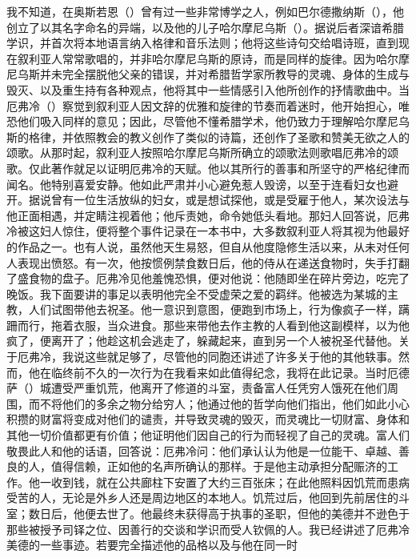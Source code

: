 我不知道，在奥斯若恩（）曾有过一些非常博学之人，例如巴尔德撒纳斯（），他创立了以其名字命名的异端，以及他的儿子哈尔摩尼乌斯（）。据说后者深谙希腊学识，并首次将本地语言纳入格律和音乐法则；他将这些诗句交给唱诗班，直到现在叙利亚人常常歌唱的，并非哈尔摩尼乌斯的原诗，而是同样的旋律。因为哈尔摩尼乌斯并未完全摆脱他父亲的错误，并对希腊哲学家所教导的灵魂、身体的生成与毁灭、以及重生持有各种观点，他将其中一些情感引入他所创作的抒情歌曲中。\newline{}当厄弗冷（）察觉到叙利亚人因文辞的优雅和旋律的节奏而着迷时，他开始担心，唯恐他们吸入同样的意见；因此，尽管他不懂希腊学术，他仍致力于理解哈尔摩尼乌斯的格律，并依照教会的教义创作了类似的诗篇，还创作了圣歌和赞美无欲之人的颂歌。从那时起，叙利亚人按照哈尔摩尼乌斯所确立的颂歌法则歌唱厄弗冷的颂歌。仅此著作就足以证明厄弗冷的天赋。他以其所行的善事和所坚守的严格纪律而闻名。他特别喜爱安静。他如此严肃并小心避免惹人毁谤，以至于连看妇女也避开。\newline{}据说曾有一位生活放纵的妇女，或是想试探他，或是受雇于他人，某次设法与他正面相遇，并定睛注视着他；他斥责她，命令她低头看地。那妇人回答说，厄弗冷被这妇人惊住，便将整个事件记录在一本书中，大多数叙利亚人将其视为他最好的作品之一。\newline{}也有人说，虽然他天生易怒，但自从他度隐修生活以来，从未对任何人表现出愤怒。有一次，他按惯例禁食数日后，他的侍从在递送食物时，失手打翻了盛食物的盘子。厄弗冷见他羞愧恐惧，便对他说：他随即坐在碎片旁边，吃完了晚饭。\newline{}我下面要讲的事足以表明他完全不受虚荣之爱的羁绊。他被选为某城的主教，人们试图带他去祝圣。他一意识到意图，便跑到市场上，行为像疯子一样，蹒跚而行，拖着衣服，当众进食。那些来带他去作主教的人看到他这副模样，以为他疯了，便离开了；他趁这机会逃走了，躲藏起来，直到另一个人被祝圣代替他。\newline{}关于厄弗冷，我说这些就足够了，尽管他的同胞还讲述了许多关于他的其他轶事。然而，他在临终前不久的一次行为在我看来如此值得纪念，我将在此记录。当时厄德萨（）城遭受严重饥荒，他离开了修道的斗室，责备富人任凭穷人饿死在他们周围，而不将他们的多余之物分给穷人；他通过他的哲学向他们指出，他们如此小心积攒的财富将变成对他们的谴责，并导致灵魂的毁灭，而灵魂比一切财富、身体和其他一切价值都更有价值；他证明他们因自己的行为而轻视了自己的灵魂。富人们敬畏此人和他的话语，回答说：厄弗冷问：他们承认认为他是一位能干、卓越、善良的人，值得信赖，正如他的名声所确认的那样。于是他主动承担分配赈济的工作。他一收到钱，就在公共廊柱下安置了大约三百张床；在此他照料因饥荒而患病受苦的人，无论是外乡人还是周边地区的本地人。饥荒过后，他回到先前居住的斗室；数日后，他便去世了。他最终未获得高于执事的圣职，但他的美德并不逊色于那些被授予司铎之位、因善行的交谈和学识而受人钦佩的人。\newline{}我已经讲述了厄弗冷美德的一些事迹。若要完全描述他的品格以及与他在同一时